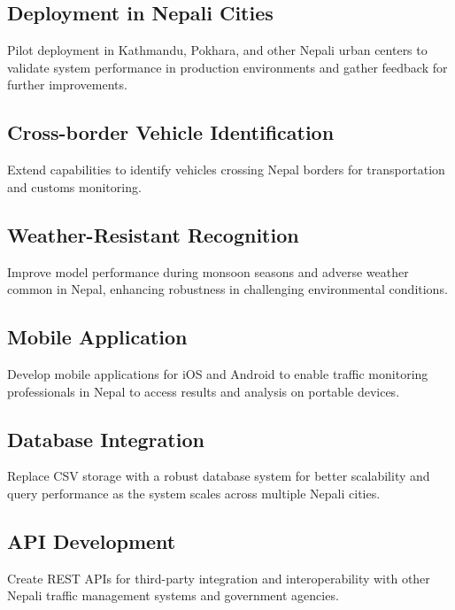 \documentclass[12pt,a4paper]{report}
\begin{document}
\subsection{Deployment in Nepali Cities}
Pilot deployment in Kathmandu, Pokhara, and other Nepali urban centers to validate system performance in production environments and gather feedback for further improvements.

\subsection{Cross-border Vehicle Identification}
Extend capabilities to identify vehicles crossing Nepal borders for transportation and customs monitoring.

\subsection{Weather-Resistant Recognition}
Improve model performance during monsoon seasons and adverse weather common in Nepal, enhancing robustness in challenging environmental conditions.

\subsection{Mobile Application}
Develop mobile applications for iOS and Android to enable traffic monitoring professionals in Nepal to access results and analysis on portable devices.

\subsection{Database Integration}
Replace CSV storage with a robust database system for better scalability and query performance as the system scales across multiple Nepali cities.

\subsection{API Development}
Create REST APIs for third-party integration and interoperability with other Nepali traffic management systems and government agencies.

\renewcommand{\bibname}{References}



\clearpage
\end{document}
